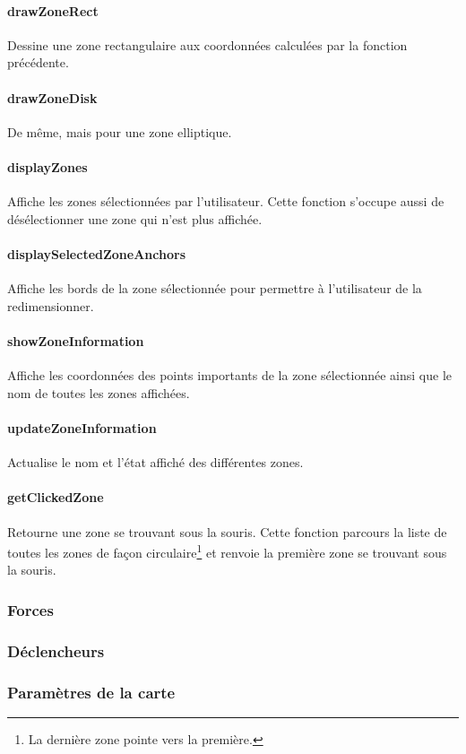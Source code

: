 \documentclass[a4paper]{article}
\begin{document}
\paragraph{drawZoneRect} Dessine une zone rectangulaire aux coordonnées calculées par la fonction précédente.
\paragraph{drawZoneDisk} De même, mais pour une zone elliptique.
\paragraph{displayZones} Affiche les zones sélectionnées par l'utilisateur. Cette fonction s'occupe aussi de désélectionner une zone qui n'est plus affichée.
\paragraph{displaySelectedZoneAnchors} Affiche les bords de la zone sélectionnée pour permettre à l'utilisateur de la redimensionner.
\paragraph{showZoneInformation} Affiche les coordonnées des points importants de la zone sélectionnée ainsi que le nom de toutes les zones affichées.
\paragraph{updateZoneInformation} Actualise le nom et l'état affiché des différentes zones.
\paragraph{getClickedZone} Retourne une zone se trouvant sous la souris. Cette fonction parcours la liste de toutes les zones de façon circulaire\footnote{La dernière zone pointe vers la première.} et renvoie la première zone se trouvant sous la souris.
\subsubsection{Forces}
\subsubsection{Déclencheurs}
\subsubsection{Paramètres de la carte}
\end{document}
